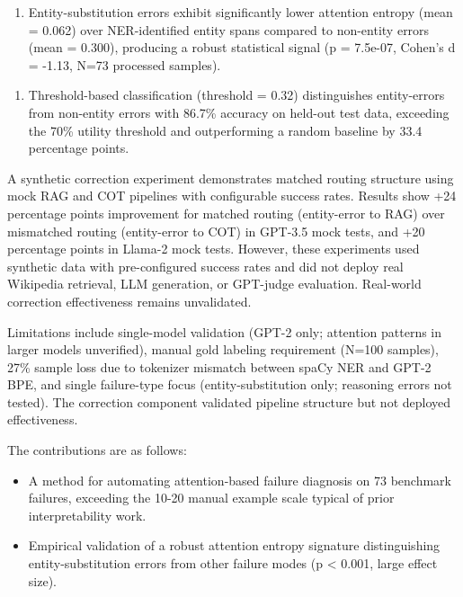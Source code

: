 \begin{enumerate}
\item Entity-substitution errors exhibit significantly lower attention entropy (mean = 0.062) over NER-identified entity spans compared to non-entity errors (mean = 0.300), producing a robust statistical signal (p = 7.5e-07, Cohen's d = -1.13, N=73 processed samples).
\end{enumerate}

\begin{enumerate}
\item Threshold-based classification (threshold = 0.32) distinguishes entity-errors from non-entity errors with 86.7\% accuracy on held-out test data, exceeding the 70\% utility threshold and outperforming a random baseline by 33.4 percentage points.
\end{enumerate}

A synthetic correction experiment demonstrates matched routing structure using mock RAG and COT pipelines with configurable success rates. Results show +24 percentage points improvement for matched routing (entity-error to RAG) over mismatched routing (entity-error to COT) in GPT-3.5 mock tests, and +20 percentage points in Llama-2 mock tests. However, these experiments used synthetic data with pre-configured success rates and did not deploy real Wikipedia retrieval, LLM generation, or GPT-judge evaluation. Real-world correction effectiveness remains unvalidated.

Limitations include single-model validation (GPT-2 only; attention patterns in larger models unverified), manual gold labeling requirement (N=100 samples), 27\% sample loss due to tokenizer mismatch between spaCy NER and GPT-2 BPE, and single failure-type focus (entity-substitution only; reasoning errors not tested). The correction component validated pipeline structure but not deployed effectiveness.

The contributions are as follows:

\begin{itemize}
\item A method for automating attention-based failure diagnosis on 73 benchmark failures, exceeding the 10-20 manual example scale typical of prior interpretability work.
\end{itemize}

\begin{itemize}
\item Empirical validation of a robust attention entropy signature distinguishing entity-substitution errors from other failure modes (p < 0.001, large effect size).
\end{itemize}

